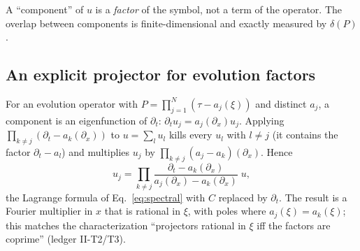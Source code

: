 \documentclass[11pt,a4paper]{article}
\theoremstyle{definition}
\newcommand{\led}[1]{\textcolor{cG}{\textsf{\footnotesize(ledger #1)}}}
\begin{document}
\begin{takeaway}
A ``component'' of $u$ is a \emph{factor} of the symbol, not a term of the operator. The overlap between components is finite-dimensional and exactly measured by $\delta(P)$.
\end{takeaway}



\subsection{An explicit projector for evolution factors}
For an evolution operator with $P=\prod_{j=1}^N(\tau-a_j(\xi))$ and distinct $a_j$, a component is an eigenfunction of $\partial_t$: $\partial_tu_j=a_j(\partial_x)u_j$. Applying $\prod_{k\ne j}(\partial_t-a_k(\partial_x))$ to $u=\sum_lu_l$ kills every $u_l$ with $l\ne j$ (it contains the factor $\partial_t-a_l$) and multiplies $u_j$ by $\prod_{k\ne j}(a_j-a_k)(\partial_x)$. Hence
\begin{equation}\label{eq:lagrange}
u_j=\prod_{k\ne j}\frac{\partial_t-a_k(\partial_x)}{a_j(\partial_x)-a_k(\partial_x)}\;u ,
\end{equation}
the Lagrange formula of Eq.~\eqref{eq:spectral} with $C$ replaced by $\partial_t$. The result is a Fourier multiplier in $x$ that is rational in $\xi$, with poles where $a_j(\xi)=a_k(\xi)$; this matches the characterization ``projectors rational in $\xi$ iff the factors are coprime'' \led{II-T2/T3}.


\end{document}
